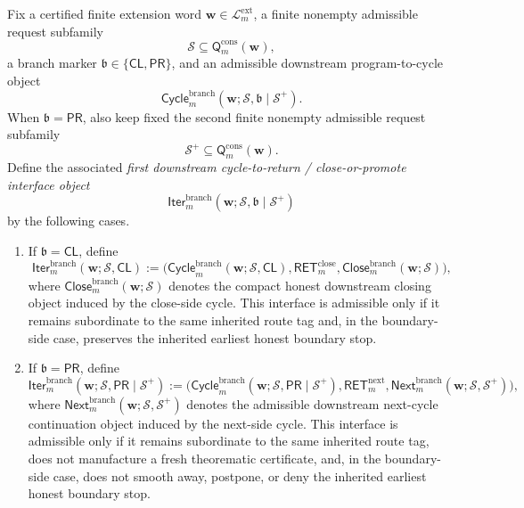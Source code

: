 \begin{definition}
\label{def:first-downstream-cycle-to-return-close-or-promote-interface-object}
Fix a certified finite extension word \(\mathbf w\in\mathcal L^{\mathrm{ext}}_{m}\), a finite nonempty admissible request subfamily
\[
 \mathcal S \subseteq \mathsf{Q}^{\mathrm{cons}}_{m}(\mathbf w),
\]
a branch marker \(\mathfrak b\in\{\mathsf{CL},\mathsf{PR}\}\), and an admissible downstream program-to-cycle object
\[
 \mathsf{Cycle}^{\mathrm{branch}}_{m}(\mathbf w;\mathcal S,\mathfrak b\mid\mathcal S^{+}).
\]
When \(\mathfrak b=\mathsf{PR}\), also keep fixed the second finite nonempty admissible request subfamily
\[
 \mathcal S^{+}\subseteq \mathsf{Q}^{\mathrm{cons}}_{m}(\mathbf w).
\]
Define the associated \emph{first downstream cycle-to-return / close-or-promote interface object}
{\small
\[
 \mathsf{Iter}^{\mathrm{branch}}_{m}(\mathbf w;\mathcal S,\mathfrak b\mid\mathcal S^{+})
\]
}
by the following cases.
\begin{enumerate}[label=(\roman*)]
 \item If \(\mathfrak b=\mathsf{CL}\), define
{\small
\[
 \mathsf{Iter}^{\mathrm{branch}}_{m}(\mathbf w;\mathcal S,\mathsf{CL})
 :=
 \bigl(\mathsf{Cycle}^{\mathrm{branch}}_{m}(\mathbf w;\mathcal S,\mathsf{CL}),\mathsf{RET}^{\mathrm{close}}_{m},\mathsf{Close}^{\mathrm{branch}}_{m}(\mathbf w;\mathcal S)\bigr),
\]
}
where \(\mathsf{Close}^{\mathrm{branch}}_{m}(\mathbf w;\mathcal S)\) denotes the compact honest downstream closing object induced by the close-side cycle. This interface is admissible only if it remains subordinate to the same inherited route tag and, in the boundary-side case, preserves the inherited earliest honest boundary stop.

 \item If \(\mathfrak b=\mathsf{PR}\), define
{\small
\[
 \mathsf{Iter}^{\mathrm{branch}}_{m}(\mathbf w;\mathcal S,\mathsf{PR}\mid\mathcal S^{+})
 :=
 \bigl(\mathsf{Cycle}^{\mathrm{branch}}_{m}(\mathbf w;\mathcal S,\mathsf{PR}\mid\mathcal S^{+}),\mathsf{RET}^{\mathrm{next}}_{m},\mathsf{Next}^{\mathrm{branch}}_{m}(\mathbf w;\mathcal S,\mathcal S^{+})\bigr),
\]
}
where \(\mathsf{Next}^{\mathrm{branch}}_{m}(\mathbf w;\mathcal S,\mathcal S^{+})\) denotes the admissible downstream next-cycle continuation object induced by the next-side cycle. This interface is admissible only if it remains subordinate to the same inherited route tag, does not manufacture a fresh theorematic certificate, and, in the boundary-side case, does not smooth away, postpone, or deny the inherited earliest honest boundary stop.
\end{enumerate}
\end{definition}

